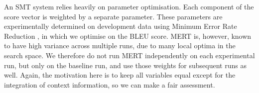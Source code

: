 \documentclass[11pt]{article}
\theoremstyle{break}
\begin{document}
An SMT system relies heavily on parameter optimisation. Each component of the
score vector is weighted by a separate parameter. These parameters are
experimentally determined on development data using Minimum Error Rate
Reduction \citep{MERT}, in which we optimise on the BLEU score. MERT is,
however, known to have high variance across multiple runs, due to many local
optima in the search space. We therefore do not run MERT independently on each
experimental run, but only on the baseline run, and use those weights for
subsequent runs as well. Again, the motivation here is to keep all variables
equal except for the integration of context information, so we can make a fair
assessment.

















\end{document}
